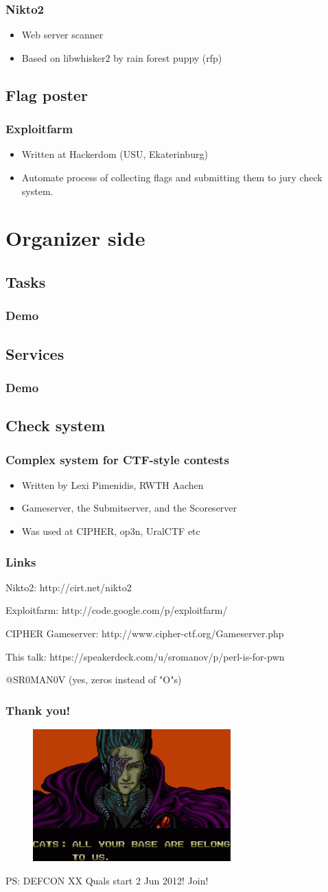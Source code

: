 \documentclass{beamer}
\begin{document}
\frame
{
\frametitle{Nikto2}
\begin{itemize}
\item Web server scanner
\item Based on libwhisker2 by rain forest puppy (rfp)
\end{itemize}
}

\subsection{Flag poster}
\frame
{
\frametitle{Exploitfarm}
\begin{itemize}
\item Written at Hackerdom (USU, Ekaterinburg)
\item Automate process of collecting flags and submitting them to jury check system.
\end{itemize}
}

\section{Organizer side}
\subsection{Tasks}
\frame
{
\frametitle{Demo}
}

\subsection{Services}
\frame
{
\frametitle{Demo}
}

\subsection{Check system}
\frame
{
\frametitle{Complex system for CTF-style contests}
\begin{itemize}
\item<1-> Written by Lexi Pimenidis, RWTH Aachen
\item<1-> Gameserver, the Submitserver, and the Scoreserver
\item<1-> Was used at CIPHER, op3n, UralCTF	etc
\end{itemize}
}

\frame
{
\frametitle{Links}
\item Nikto2: http://cirt.net/nikto2
\item Exploitfarm: http://code.google.com/p/exploitfarm/
\item CIPHER Gameserver: http://www.cipher-ctf.org/Gameserver.php
\item This talk: https://speakerdeck.com/u/sromanov/p/perl-is-for-pwn
\item @SR0MAN0V (yes, zeros instead of "O"s)
}

\frame
{
\frametitle{Thank you!}
\begin{figure}
\includegraphics[width=3in,height=2in]{pics/aybabtu.png}
\end{figure}

PS: DEFCON XX Quals start 2 Jun 2012! Join!
}
\end{document}
